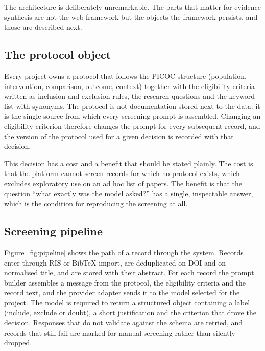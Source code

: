 The architecture is deliberately unremarkable. The parts that matter for
evidence synthesis are not the web framework but the objects the framework
persists, and those are described next.

\subsection{The protocol object}\label{sec:protocol}

Every project owns a protocol that follows the PICOC structure (population,
intervention, comparison, outcome, context) together with the eligibility
criteria written as inclusion and exclusion rules, the research questions and
the keyword list with synonyms. The protocol is not documentation stored next
to the data: it is the single source from which every screening prompt is
assembled. Changing an eligibility criterion therefore changes the prompt for
every subsequent record, and the version of the protocol used for a given
decision is recorded with that decision.

This decision has a cost and a benefit that should be stated plainly. The cost
is that the platform cannot screen records for which no protocol exists, which
excludes exploratory use on an ad hoc list of papers. The benefit is that the
question ``what exactly was the model asked?'' has a single, inspectable
answer, which is the condition for reproducing the screening at all.

\subsection{Screening pipeline}

Figure~\ref{fig:pipeline} shows the path of a record through the system.
Records enter through RIS or BibTeX import, are deduplicated on DOI and on
normalised title, and are stored with their abstract. For each record the
prompt builder assembles a message from the protocol, the eligibility
criteria and the record text, and the provider adapter sends it to the model
selected for the project. The model is required to return a structured object
containing a label (include, exclude or doubt), a short justification and the
criterion that drove the decision. Responses that do not validate against the
schema are retried, and records that still fail are marked for manual
screening rather than silently dropped.

